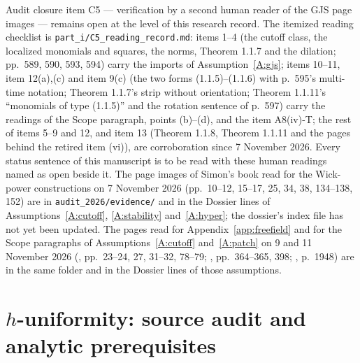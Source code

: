 \documentclass[11pt,a4paper]{article}
\theoremstyle{plain}
\theoremstyle{definition}
\theoremstyle{plain}
\theoremstyle{definition}
\begin{document}
Audit closure item C5 --- verification by a second human reader of the GJS page
images --- remains open at the level of this research record.  The itemized reading
checklist is \texttt{part\_i/C5\_reading\_record.md}: items 1--4 (the cutoff class, the
localized monomials and squares, the norms, Theorem 1.1.7 and the dilation; pp.~589, 590,
593, 594) carry the imports of Assumption~\ref{A:gjs}; items 10--11, item 12(a),(c) and
item 9(c) (the two forms (1.1.5)--(1.1.6) with p.~595's multi-time notation; Theorem 1.1.7's
strip without orientation; Theorem 1.1.11's ``monomials of type (1.1.5)'' and the rotation
sentence of p.~597) carry the readings of the Scope paragraph, points (b)--(d), and the item
A8(iv)-T; the rest of items 5--9 and 12, and item 13 (Theorem 1.1.8, Theorem 1.1.11 and the
pages behind the retired item (vi)), are corroboration since 7 November 2026.  Every status
sentence of this manuscript is to be read with these human readings named as open beside
it.  The page images of Simon's book read for the Wick-power constructions on 7 November
2026 (pp.~10--12, 15--17, 25, 34, 38, 134--138, 152) are in
\texttt{audit\_2026/}\allowbreak\texttt{evidence/} and in the Dossier lines of
Assumptions~\ref{A:cutoff}, \ref{A:stability} and~\ref{A:hyper}; the dossier's index file has
not yet been updated.  The pages read for Appendix~\ref{app:freefield} and for the Scope
paragraphs of Assumptions~\ref{A:cutoff} and~\ref{A:patch} on 9 and 11 November 2026
(\cite{SimonBook}, pp.~23--24, 27, 31--32, 78--79; \cite{GJ2}, pp.~364--365, 398;
\cite{GJ1}, p.~1948) are in the same folder and in the Dossier lines of those assumptions.

\section{$h$-uniformity: source audit and analytic prerequisites}\label{app:huniform}
\end{document}
